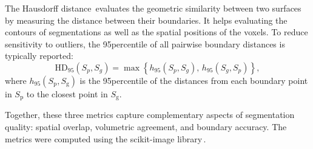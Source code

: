 The Hausdorff distance\,\cite{Hausdorff1991, FeTA2021_review} evaluates the geometric similarity between two surfaces by measuring the distance between their boundaries. It helps evaluating the contours of segmentations as well as the spatial positions of the voxels. To reduce sensitivity to outliers, the 95\th percentile of all pairwise boundary distances is typically reported:
\begin{equation}
    \text{HD}_{95}(S_p, S_g) = \max \left\{ h_{95}(S_p, S_g), \, h_{95}(S_g, S_p) \right\},
\end{equation}
where $h_{95}(S_\text{p}, S_\text{g})$ is the 95\th percentile of the distances from each boundary point in $S_\text{p}$ to the closest point in $S_\text{g}$.

Together, these three metrics capture complementary aspects of segmentation quality: spatial overlap, volumetric agreement, and boundary accuracy. The metrics were computed using the scikit-image library\,\cite{Walt2014, scikit-image}.
